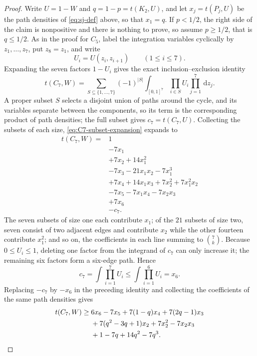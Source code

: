 \documentclass[11pt]{article}
\numberwithin{equation}{section}
\newcommand{\dd}{\,\mathrm d}
\begin{document}
\begin{proof}
  Write $U=1-W$ and $q=1-p=t(K_2,U)$, and let $x_j=t(P_j,U)$ be the path
  densities of \eqref{eq:sj-def} above, so that $x_1=q$.  If $p<1/2$, the
  right side of the claim is nonpositive and there is nothing to prove, so
  assume $p\ge1/2$, that is $q\le1/2$.  As in the proof for $C_5$, label the
  integration variables cyclically by $z_1,\ldots,z_7$, put $z_8=z_1$, and
  write
  \[
    U_i=U(z_i,z_{i+1})\qquad(1\le i\le7).
  \]
  Expanding the seven factors $1-U_i$ gives the exact inclusion--exclusion
  identity
  \begin{equation}\label{eq:C7-subset-expansion}
    t(C_7,W)
    =\sum_{S\subseteq\{1,\ldots,7\}}(-1)^{|S|}
    \int_{[0,1]^7}\prod_{i\in S}U_i\prod_{j=1}^7\dd z_j.
  \end{equation}
  A proper subset $S$ selects a disjoint union of paths around the cycle, and
  its variables separate between the components, so its term is the
  corresponding product of path densities; the full subset gives
  $c_7=t(C_7,U)$.  Collecting the subsets of each size, \eqref{eq:C7-subset-expansion}
  expands to
  \begin{align*}
    t(C_7,W)={}&1\\
    &-7x_1\\
    &+7x_2+14x_1^2\\
    &-7x_3-21x_1x_2-7x_1^3\\
    &+7x_4+14x_1x_3+7x_2^2+7x_1^2x_2\\
    &-7x_5-7x_1x_4-7x_2x_3\\
    &+7x_6\\
    &-c_7.
  \end{align*}
  The seven subsets of size one each contribute $x_1$; of the $21$ subsets of
  size two, seven consist of two adjacent edges and contribute $x_2$ while the
  other fourteen contribute $x_1^2$; and so on, the coefficients in each line
  summing to $\binom7k$.  Because $0\le U_i\le1$, deleting one factor from the
  integrand of $c_7$
  can only increase it; the remaining six factors form a six-edge path.
  Hence
  \[
    c_7=\int\prod_{i=1}^7U_i
    \le\int\prod_{i=1}^6U_i=x_6.
  \]
  Replacing $-c_7$ by $-x_6$ in the preceding identity and collecting the
  coefficients of the same path densities gives
  \begin{align}
    t(C_7,W)\ge{}&6x_6-7x_5+7(1-q)x_4+7(2q-1)x_3 \notag\\
    &+7(q^2-3q+1)x_2+7x_2^2-7x_2x_3 \notag\\
    &+1-7q+14q^2-7q^3. \label{eq:C7-IE}

\end{align}
\end{proof}
\end{document}
